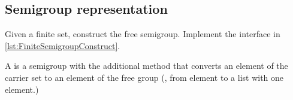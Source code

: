 \subsection{Semigroup representation}
\label{sec:free-semigroup}

\begin{codeexercise}
    \label{ex:TestFiniteSemigroupConstruct}
    Given a finite set, construct the free semigroup.
    Implement the interface in \cref{lst:FiniteSemigroupConstruct}.
\end{codeexercise}


A \FreeSemigroup is a semigroup with the additional method  that converts an element of the carrier set to an element of the free group (\eg, from element to a list with one element.)

